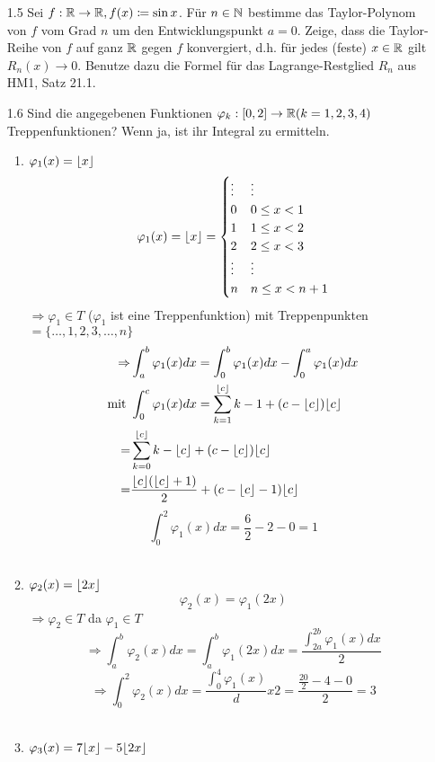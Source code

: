 \documentclass{HM}
\begin{document}
	\begin{enumerate}
		\item[1.5] Sei $f:\mathbb{R}\to\mathbb{R}, f(x)\coloneqq\sin x$. Für $n\in\mathbb{N}$ bestimme das Taylor-Polynom von $f$ vom Grad $n$ um den Entwicklungspunkt $a=0$. Zeige, dass die Taylor-Reihe von $f$ auf ganz $\mathbb{R}$ gegen $f$ konvergiert, d.h. für jedes (feste) $x\in\mathbb{R}$ gilt $R_n(x)\to 0$. Benutze dazu die Formel für das Lagrange-Restglied $R_n$ aus HM1, Satz 21.1.
		
		\item[1.6] Sind die angegebenen Funktionen $\varphi_k:[0,2]\to\mathbb{R}(k=1,2,3,4)$ Treppenfunktionen? Wenn ja, ist ihr Integral zu ermitteln.
		\begin{enumerate}
			\item $\varphi_1(x)=\lfloor x\rfloor$
				$$\varphi_1(x)=\lfloor x\rfloor=\begin{cases}
					\vdots& \vdots\\
					0&0\leq x < 1\\
					1&1\leq x < 2\\
					2&2\leq x < 3\\
					\vdots& \vdots\\
					n&n\leq x < n+1				
				\end{cases}$$
				$\Rightarrow \varphi_1\in T$ ($\varphi_1$ ist eine Treppenfunktion) mit Treppenpunkten $= \{\hdots,1,2,3,\hdots,n\}$\\
				\begin{align*}
					\Rightarrow &\int_a^b\varphi_1(x)dx = \int_0^b\varphi_1(x)dx-\int_0^a\varphi_1(x)dx\\
					\text{mit }&\int_0^c\varphi_1(x)dx
					=\sum\limits_{k=1}^{\lfloor c\rfloor}k-1 + (c-\lfloor c\rfloor)\lfloor c\rfloor\\
					=&\sum\limits_{k=0}^{\lfloor c\rfloor}k - \lfloor c\rfloor + (c-\lfloor c\rfloor)\lfloor c\rfloor\\
					=&\frac{\lfloor c\rfloor(\lfloor c\rfloor+1)}{2}+(c-\lfloor c\rfloor-1)\lfloor c\rfloor
				\end{align*}
				$$\int_0^2\varphi_1(x)dx=\frac{6}{2}-2-0=1$$\\
			\item $\varphi_2(x)=\lfloor2x\rfloor$
				$$\varphi_2(x)=\varphi_1(2x)$$
				$\Rightarrow \varphi_2\in T$ da $\varphi_1\in T$
				$$\Rightarrow \int_a^b\varphi_2(x)dx=\int_a^b\varphi_1(2x)dx=\frac{\int_{2a}^{2b}\varphi_1(x)dx}{2}$$
				$$\Rightarrow\int_0^2\varphi_2(x)dx=\frac{\int_0^4\varphi_1(x)}dx{2}=\frac{\frac{20}{2}-4-0}{2}=3$$\\
			\item $\varphi_3(x)=7\lfloor x\rfloor-5\lfloor2x\rfloor$

\end{enumerate}
\end{enumerate}
\end{document}
